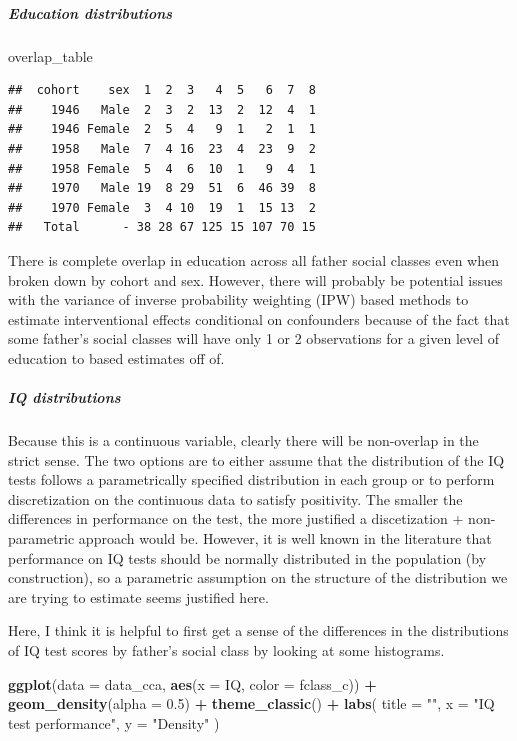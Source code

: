 \documentclass[
]{article}
\newenvironment{Shaded}{\begin{snugshade}}{\end{snugshade}}
\newcommand{\AttributeTok}[1]{\textcolor[rgb]{0.13,0.29,0.53}{#1}}
\newcommand{\FloatTok}[1]{\textcolor[rgb]{0.00,0.00,0.81}{#1}}
\newcommand{\FunctionTok}[1]{\textcolor[rgb]{0.13,0.29,0.53}{\textbf{#1}}}
\newcommand{\NormalTok}[1]{#1}
\newcommand{\SpecialCharTok}[1]{\textcolor[rgb]{0.81,0.36,0.00}{\textbf{#1}}}
\newcommand{\StringTok}[1]{\textcolor[rgb]{0.31,0.60,0.02}{#1}}
\begin{document}
\subparagraph{Education distributions}\label{education-distributions}

\begin{Shaded}
\begin{Highlighting}[]
\NormalTok{overlap\_table}
\end{Highlighting}
\end{Shaded}

\begin{verbatim}
##  cohort    sex  1  2  3   4  5   6  7  8
##    1946   Male  2  3  2  13  2  12  4  1
##    1946 Female  2  5  4   9  1   2  1  1
##    1958   Male  7  4 16  23  4  23  9  2
##    1958 Female  5  4  6  10  1   9  4  1
##    1970   Male 19  8 29  51  6  46 39  8
##    1970 Female  3  4 10  19  1  15 13  2
##   Total      - 38 28 67 125 15 107 70 15
\end{verbatim}

There is complete overlap in education across all father social classes
even when broken down by cohort and sex. However, there will probably be
potential issues with the variance of inverse probability weighting
(IPW) based methods to estimate interventional effects conditional on
confounders because of the fact that some father's social classes will
have only 1 or 2 observations for a given level of education to based
estimates off of.

\subparagraph{IQ distributions}\label{iq-distributions}

Because this is a continuous variable, clearly there will be non-overlap
in the strict sense. The two options are to either assume that the
distribution of the IQ tests follows a parametrically specified
distribution in each group or to perform discretization on the
continuous data to satisfy positivity. The smaller the differences in
performance on the test, the more justified a discetization +
non-parametric approach would be. However, it is well known in the
literature that performance on IQ tests should be normally distributed
in the population (by construction), so a parametric assumption on the
structure of the distribution we are trying to estimate seems justified
here.

Here, I think it is helpful to first get a sense of the differences in
the distributions of IQ test scores by father's social class by looking
at some histograms.

\begin{Shaded}
\begin{Highlighting}[]
\FunctionTok{ggplot}\NormalTok{(}\AttributeTok{data =}\NormalTok{ data\_cca, }\FunctionTok{aes}\NormalTok{(}\AttributeTok{x =}\NormalTok{ IQ, }\AttributeTok{color =}\NormalTok{ fclass\_c)) }\SpecialCharTok{+}
  \FunctionTok{geom\_density}\NormalTok{(}\AttributeTok{alpha =} \FloatTok{0.5}\NormalTok{) }\SpecialCharTok{+}
  \FunctionTok{theme\_classic}\NormalTok{() }\SpecialCharTok{+}
  \FunctionTok{labs}\NormalTok{(}
    \AttributeTok{title =} \StringTok{""}\NormalTok{,}
    \AttributeTok{x =} \StringTok{"IQ test performance"}\NormalTok{,}
    \AttributeTok{y =} \StringTok{"Density"}
\NormalTok{  )}
\end{Highlighting}
\end{Shaded}
\end{document}
